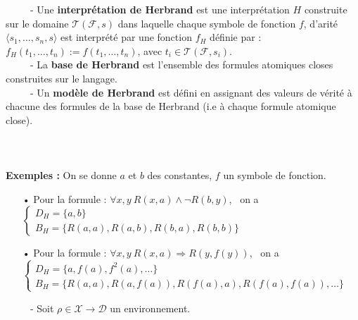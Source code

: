 \documentclass[11pt,a4paper]{article}
\begin{document}
\ \ \ \ \ - Une \textbf{interprétation de Herbrand} est une interprétation $H$ construite sur le domaine $\mathcal{T}(\mathcal{F},s)$ dans laquelle chaque symbole de fonction $f$, d'arité $\langle s_1, \dots,s_n ,s \rangle $ est interprété par une fonction $f_H$ définie par : $f_H(t_1, \dots , t_n) := f(t_1,\dots, t_n)$, avec $t_i \in \mathcal{T}(\mathcal{F},s_i)$. \\

\ \ \ \ \ - La \textbf{base de Herbrand} est l'ensemble des formules atomiques closes construites sur le langage. \\

\ \ \ \ \ - Un \textbf{modèle de Herbrand} est défini en assignant des valeurs de vérité à chacune des formules de la base de Herbrand (i.e à chaque formule atomique close). \\ \\ \\ \\

\textbf{Exemples : } 
On se donne $a$ et $b$ des constantes, $f$ un symbole de fonction.
\begin{itemize}
\item[•] Pour la formule : $\forall x ,y \ R(x,a) \land \lnot R(b,y)$, \ on a  $\begin{cases} D_H = \{ a,b \} \\ B_H =\{ R(a,a),R(a,b),R(b,a),R(b,b) \} \end{cases}$
\item[•] Pour la formule : $\forall x,y \ R(x,a) \Rightarrow R(y,f(y))$, \ on a $\begin{cases} D_H = \{ a,f(a),f^2(a), \dots \} \\ B_H =\{ R(a,a),R(a,f(a)),R(f(a),a),R(f(a),f(a)),\dots\} \end{cases}$
\\
\end{itemize} 

\ \ \ \ \ - Soit $\rho \in \mathcal{X} \to \mathcal{D}$ un environnement. \\
\end{document}
